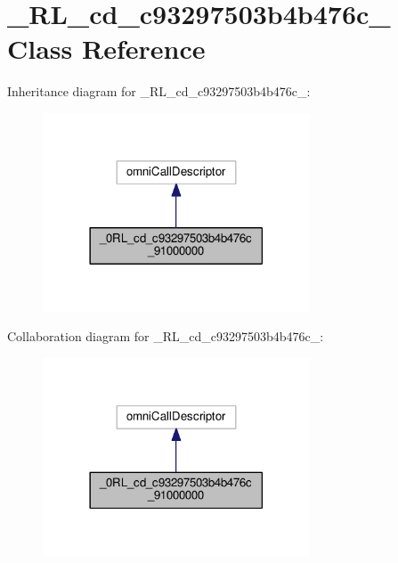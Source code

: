 \hypertarget{class__0_r_l__cd__c93297503b4b476c__91000000}{}\section{\+\_\+R\+L\+\_\+cd\+\_\+c93297503b4b476c\+\_ Class Reference}
\label{class__0_r_l__cd__c93297503b4b476c__91000000}


Inheritance diagram for \+\_\+R\+L\+\_\+cd\+\_\+c93297503b4b476c\+\_\+:
\nopagebreak
\begin{figure}[H]
\begin{center}
\leavevmode
\includegraphics[width=225pt]{class__0_r_l__cd__c93297503b4b476c__91000000__inherit__graph}
\end{center}
\end{figure}


Collaboration diagram for \+\_\+R\+L\+\_\+cd\+\_\+c93297503b4b476c\+\_\+:
\nopagebreak
\begin{figure}[H]
\begin{center}
\leavevmode
\includegraphics[width=225pt]{class__0_r_l__cd__c93297503b4b476c__91000000__coll__graph}
\end{center}
\end{figure}
